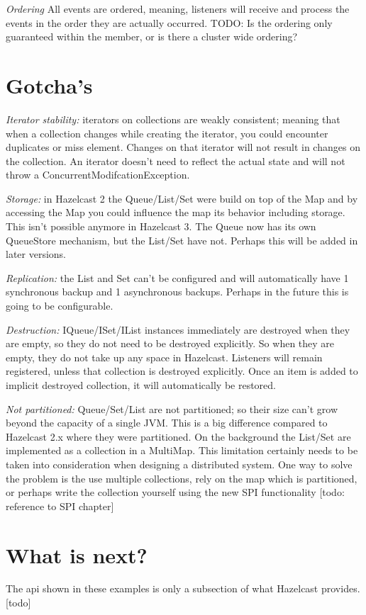 \emph{Ordering} All events are ordered, meaning, listeners will receive and process the events in the order they are actually occurred. TODO: Is the ordering only guaranteed within the member, or is there a cluster wide ordering?

\section{Gotcha's}

\emph{Iterator stability:} iterators on collections are weakly consistent; meaning that when a collection changes while creating the iterator, you could encounter duplicates or miss element. Changes on that iterator will not result in changes on the collection. An iterator doesn't need to reflect the actual state and will not throw a ConcurrentModifcationException. 

\emph{Storage:} in Hazelcast 2 the Queue/List/Set were build on top of the Map and by accessing the Map you could influence the map its behavior including storage. This isn't possible anymore in Hazelcast 3. The Queue now has its own QueueStore mechanism, but the List/Set have not. Perhaps this will be added in later versions.

\emph{Replication:} the List and Set can't be configured and will automatically have 1 synchronous backup and 1 asynchronous backups. Perhaps in the future this is going to be configurable.

\emph{Destruction:} IQueue/ISet/IList instances immediately are destroyed when they are empty, so they do not need to be destroyed explicitly. So when they are empty, they do not take up any space in Hazelcast. Listeners will remain registered, unless that collection is destroyed explicitly. Once an item is added to implicit destroyed collection, it will automatically be restored.

\emph{Not partitioned:} Queue/Set/List are not partitioned; so their size can't grow beyond the capacity of a single JVM. This is a big difference compared to Hazelcast 2.x where they were partitioned. On the background the List/Set are implemented as a collection in a MultiMap. This limitation certainly needs to be taken into consideration when designing a distributed system. One way to solve the problem is the use multiple collections,  rely on the map which is partitioned, or perhaps write the collection yourself using the new SPI functionality [todo: reference to SPI chapter]

\section{What is next?}
The api shown in these examples is only a subsection of what Hazelcast provides.[todo]